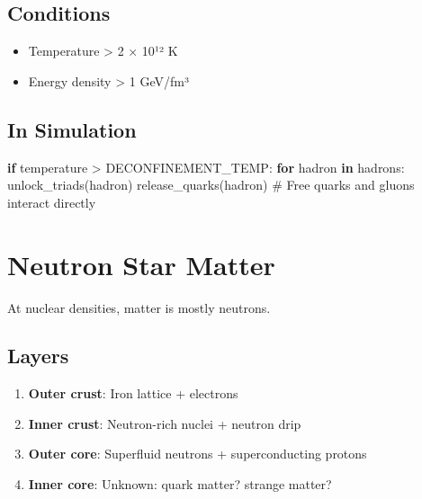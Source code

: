 \documentclass[
  11pt,
  letterpaper,
  twoside,
  openright]{book}
\newenvironment{Shaded}{\begin{snugshade}}{\end{snugshade}}
\newcommand{\CommentTok}[1]{\textcolor[rgb]{0.37,0.37,0.37}{#1}}
\newcommand{\ControlFlowTok}[1]{\textcolor[rgb]{0.00,0.23,0.31}{\textbf{#1}}}
\newcommand{\KeywordTok}[1]{\textcolor[rgb]{0.00,0.23,0.31}{\textbf{#1}}}
\newcommand{\NormalTok}[1]{\textcolor[rgb]{0.00,0.23,0.31}{#1}}
\newcommand{\OperatorTok}[1]{\textcolor[rgb]{0.37,0.37,0.37}{#1}}
\providecommand{\tightlist}{%
  \setlength{\itemsep}{0pt}\setlength{\parskip}{0pt}}
\begin{document}
\subsection{Conditions}\label{conditions}

\begin{itemize}
\tightlist
\item
  Temperature \textgreater{} 2 × 10¹² K
\item
  Energy density \textgreater{} 1 GeV/fm³
\end{itemize}

\subsection{In Simulation}\label{in-simulation-3}

\begin{Shaded}
\begin{Highlighting}[]
\ControlFlowTok{if}\NormalTok{ temperature }\OperatorTok{\textgreater{}}\NormalTok{ DECONFINEMENT\_TEMP:}
    \ControlFlowTok{for}\NormalTok{ hadron }\KeywordTok{in}\NormalTok{ hadrons:}
\NormalTok{        unlock\_triads(hadron)}
\NormalTok{        release\_quarks(hadron)}
    \CommentTok{\# Free quarks and gluons interact directly}
\end{Highlighting}
\end{Shaded}

\section{Neutron Star Matter}\label{neutron-star-matter}

At nuclear densities, matter is mostly neutrons.

\subsection{Layers}\label{layers}

\begin{enumerate}
\def\labelenumi{\arabic{enumi}.}
\tightlist
\item
  \textbf{Outer crust}: Iron lattice + electrons
\item
  \textbf{Inner crust}: Neutron-rich nuclei + neutron drip
\item
  \textbf{Outer core}: Superfluid neutrons + superconducting protons
\item
  \textbf{Inner core}: Unknown: quark matter? strange matter?
\end{enumerate}
\end{document}
